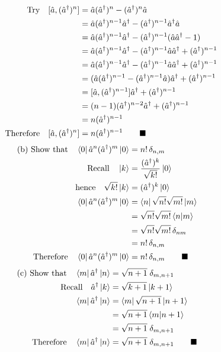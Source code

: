\documentclass{amsart}
\begin{document}
\begin{align*}
    \qq{Try}[\hat{a},(\hat{a}^\dagger)^n]&=\hat{a}(\hat{a}^\dagger)^n-(\hat{a}^\dagger)^n \hat{a}\\
    &=\hat{a}(\hat{a}^\dagger)^{n-1}\hat{a}^\dagger-(\hat{a}^\dagger)^{n-1}\hat{a}^\dagger \hat{a}\\
    &=\hat{a}(\hat{a}^\dagger)^{n-1}\hat{a}^\dagger-(\hat{a}^\dagger)^{n-1}(\hat{a}\hat{a}^\dagger -1 )\\
    &=\hat{a}(\hat{a}^\dagger)^{n-1}\hat{a}^\dagger-(\hat{a}^\dagger)^{n-1}\hat{a}\hat{a}^\dagger +(\hat{a}^\dagger)^{n-1}\\
    &=\hat{a}(\hat{a}^\dagger)^{n-1}\hat{a}^\dagger-(\hat{a}^\dagger)^{n-1}\hat{a}\hat{a}^\dagger +(\hat{a}^\dagger)^{n-1}\\
    &=(\hat{a}(\hat{a}^\dagger)^{n-1}-(\hat{a}^\dagger)^{n-1}\hat{a})\hat{a}^\dagger +(\hat{a}^\dagger)^{n-1}\\
    &=[\hat{a},(\hat{a}^\dagger)^{n-1}]\hat{a}^\dagger +(\hat{a}^\dagger)^{n-1}\\
    &=(n-1)(\hat{a}^\dagger)^{n-2}\hat{a}^\dagger+(\hat{a}^\dagger)^{n-1}\\
    &=n(\hat{a}^\dagger)^{n-1}\\
    \qq{Therefore}[\hat{a},(\hat{a}^\dagger)^n]&=n(\hat{a}^\dagger)^{n-1}\qquad\blacksquare
\end{align*}
\begin{align*}
    \qq*{(b) Show that}\bra{0}\hat{a}^n(\hat{a}^\dagger)^m\ket{0} &=n!\,\delta_{n,m}  \\
    \qq{Recall} \ket{k}&=\frac{(\hat{a}^\dagger)^k}{\sqrt{k!}}\ket{0}\\
    \qq{hence} \sqrt{k!}\ket{k}&=(\hat{a}^\dagger)^k \ket{0} \\
    \bra{0}\hat{a}^n(\hat{a}^\dagger)^m\ket{0} &=\bra{n}\sqrt{n!}\sqrt{m!}\ket{m}\\
    &=\sqrt{n!}\sqrt{m!}\bra{n}\ket{m}\\
    &=\sqrt{n!}\sqrt{m!}\,\delta_{nm}\\
    &=n!\,\delta_{n,m}\\
    \qq{Therefore}\bra{0}\hat{a}^n(\hat{a}^\dagger)^m\ket{0} &=n!\,\delta_{n,m}\qquad\blacksquare
\end{align*}
\begin{align*}
    \qq*{(c) Show that}\bra{m}\hat{a}^\dagger\ket{n}  &=\sqrt{n+1}\;\delta_{m,n+1}  \\
    \qq{Recall}\hat{a}^\dagger\ket{k}&=\sqrt{k+1}\ket{k+1}\\
    \bra{m}\hat{a}^\dagger\ket{n} &= \bra{m}\sqrt{n+1}\ket{n+1}\\
    &= \sqrt{n+1}\bra{m}\ket{n+1}\\
    &=\sqrt{n+1}\;\delta_{m,n+1}\\
    \qq{Therefore}\bra{m}\hat{a}^\dagger\ket{n}  &=\sqrt{n+1}\;\delta_{m,n+1}\qquad\blacksquare
\end{align*}
\end{document}
